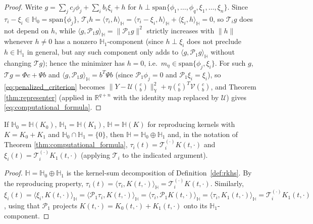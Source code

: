 \begin{proof}
Write $g=\sum_jc_j\phi_j+\sum_ib_i\xi_i+h$ for $h\perp\mathrm{span}\{
\phi_1,\dots,\phi_q,\xi_1,\dots,\xi_n\}$. Since $\tau_i-\xi_i\in
\mathbb{H}_0=\mathrm{span}\{\phi_j\}$, $\mathcal{T}_ih=\langle\tau_i,h
\rangle_{\mathbb{H}} = \langle\tau_i-\xi_i,h\rangle_{\mathbb{H}}+\langle
\xi_i,h\rangle_{\mathbb{H}}=0$, so $\mathcal{T}_ig$ does not depend on $h$,
while $\langle g,\mathcal{P}_1g\rangle_{\mathbb{H}} = \|\mathcal{P}_1g\|^2$
strictly increases with $\|h\|$ whenever $h\neq 0$ has a nonzero
$\mathbb{H}_1$-component (since $h\perp\xi_i$ does not preclude $h\in
\mathbb{H}_1$ in general, but any such component only adds to
$\langle g,\mathcal{P}_1g\rangle_{\mathbb{H}}$ without changing $\mathcal{T}
g$); hence the minimizer has $h=0$, i.e.\ $m_\eta\in\mathrm{span}\{\phi_j,
\xi_i\}$. For such $g$, $\mathcal{T}g=\Phi c+\Psi b$ and $\langle g,
\mathcal{P}_1g\rangle_{\mathbb{H}}=b^T\Psi b$ (since $\mathcal{P}_1\phi_j=0$
and $\mathcal{P}_1\xi_i=\xi_i$), so
\eqref{eq:penalized_criterion} becomes $\|Y-\mathcal{U}\binom{c}{b}\|_{
\mathbb{Y}}^2+\eta\binom{c}{b}^T\mathcal{V}\binom{c}{b}$, and Theorem
\ref{thm:representer} (applied in $\mathbb{R}^{q+n}$ with the identity
map replaced by $\mathcal{U}$) gives \eqref{eq:computational_formula}.
\end{proof}

\begin{theorem}
\label{thm:rkhs_computational}
If $\mathbb{H}_0=\mathbb{H}(K_0)$, $\mathbb{H}_1=\mathbb{H}(K_1)$,
$\mathbb{H}=\mathbb{H}(K)$ for reproducing kernels with $K=K_0+K_1$ and
$\mathbb{H}_0\cap\mathbb{H}_1=\{0\}$, then $\mathbb{H}=\mathbb{H}_0\oplus
\mathbb{H}_1$ and, in the notation of Theorem
\ref{thm:computational_formula}, $\tau_i(t)=\mathcal{T}_i^{(\cdot)}K(t,
\cdot)$ and $\xi_i(t)=\mathcal{T}_i^{(\cdot)}K_1(t,\cdot)$ (applying
$\mathcal{T}_i$ to the indicated argument).
\end{theorem}

\begin{proof}
$\mathbb{H}=\mathbb{H}_0\oplus\mathbb{H}_1$ is the kernel-sum decomposition
of Definition~\ref{def:rkhs}. By the reproducing
property, $\tau_i(t)=\langle\tau_i,K(t,\cdot)\rangle_{\mathbb{H}} =
\mathcal{T}_i^{(\cdot)}K(t,\cdot)$. Similarly, $\xi_i(t) = \langle\xi_i,
K(t,\cdot)\rangle_{\mathbb{H}} = \langle\mathcal{P}_1\tau_i,K(t,\cdot)
\rangle_{\mathbb{H}} = \langle\tau_i,\mathcal{P}_1K(t,\cdot)\rangle_{
\mathbb{H}} = \langle\tau_i,K_1(t,\cdot)\rangle_{\mathbb{H}} =
\mathcal{T}_i^{(\cdot)}K_1(t,\cdot)$, using that $\mathcal{P}_1$ projects
$K(t,\cdot)=K_0(t,\cdot)+K_1(t,\cdot)$ onto its $\mathbb{H}_1$-component.
\end{proof}

